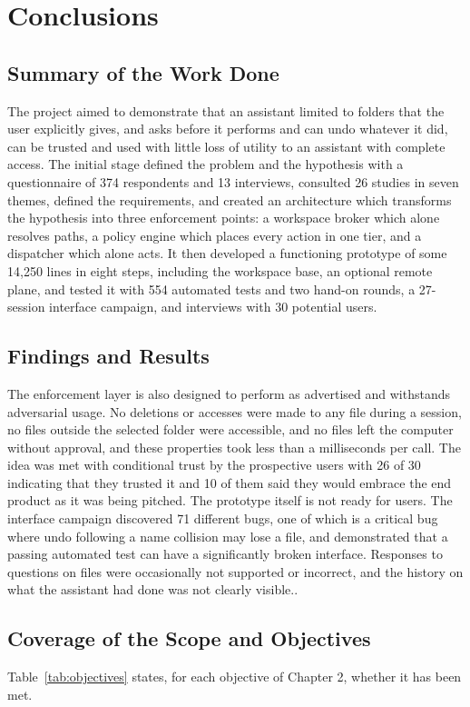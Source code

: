 \documentclass{FastFyp}
\begin{document}
\chapter{Conclusions}
\section{Summary of the Work Done}
The project aimed to demonstrate that an assistant limited to folders that the user explicitly gives, and asks before it performs and can undo whatever it did, can be trusted and used with little loss of utility to an assistant with complete access. The initial stage defined the problem and the hypothesis with a questionnaire of 374 respondents and 13 interviews, consulted 26 studies in seven themes, defined the requirements, and created an architecture which transforms the hypothesis into three enforcement points: a workspace broker which alone resolves paths, a policy engine which places every action in one tier, and a dispatcher which alone acts. It then developed a functioning prototype of some 14,250 lines in eight steps, including the workspace base, an optional remote plane, and tested it with 554 automated tests and two hand-on rounds, a 27-session interface campaign, and interviews with 30 potential users.

\section{Findings and Results}
The enforcement layer is also designed to perform as advertised and withstands adversarial usage. No deletions or accesses were made to any file during a session, no files outside the selected folder were accessible, and no files left the computer without approval, and these properties took less than a milliseconds per call. The idea was met with conditional trust by the prospective users with 26 of 30 indicating that they trusted it and 10 of them said they would embrace the end product as it was being pitched. The prototype itself is not ready for users. The interface campaign discovered 71 different bugs, one of which is a critical bug where undo following a name collision may lose a file, and demonstrated that a passing automated test can have a significantly broken interface. Responses to questions on files were occasionally not supported or incorrect, and the history on what the assistant had done was not clearly visible..

\section{Coverage of the Scope and Objectives}
Table~\ref{tab:objectives} states, for each objective of Chapter 2, whether it has been met.
\end{document}
